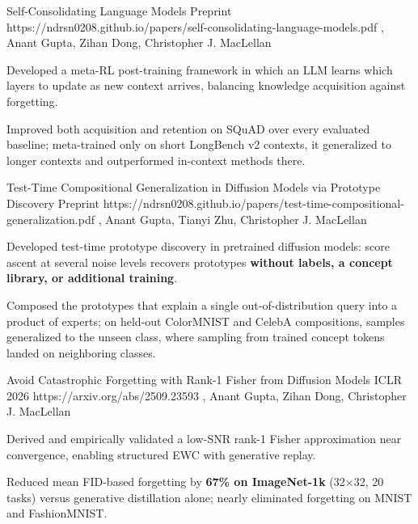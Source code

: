 \begin{samepage}
\CVPaperHeading
  {Self-Consolidating Language Models}
  {Preprint}
  {https://ndrsn0208.github.io/papers/self-consolidating-language-models.pdf}
  {\CVNameInAuthors\CVEqual, Anant Gupta\CVEqual, Zihan Dong, Christopher J. MacLellan}
\begin{CVHighlights}
  \item Developed a meta-RL post-training framework in which an LLM learns which
    layers to update as new context arrives, balancing knowledge acquisition
    against forgetting.
  \item Improved both acquisition and retention on SQuAD over every evaluated
    baseline; meta-trained only on short LongBench v2 contexts, it generalized to
    longer contexts and outperformed in-context methods there.
\end{CVHighlights}
\end{samepage}
\CVProjectGap

\begin{samepage}
\CVPaperHeading
  {Test-Time Compositional Generalization in Diffusion Models via Prototype Discovery}
  {Preprint}
  {https://ndrsn0208.github.io/papers/test-time-compositional-generalization.pdf}
  {\CVNameInAuthors, Anant Gupta, Tianyi Zhu, Christopher J. MacLellan}
\begin{CVHighlights}
  \item Developed test-time prototype discovery in pretrained diffusion models: score
    ascent at several noise levels recovers prototypes \textbf{without labels, a
    concept library, or additional training}.
  \item Composed the prototypes that explain a single out-of-distribution query into
    a product of experts; on held-out ColorMNIST and CelebA compositions, samples
    generalized to the unseen class, where sampling from trained concept tokens
    landed on neighboring classes.
\end{CVHighlights}
\end{samepage}
\CVProjectGap

\begin{samepage}
\CVPaperHeading
  {Avoid Catastrophic Forgetting with Rank-1 Fisher from Diffusion Models}
  {ICLR 2026}
  {https://arxiv.org/abs/2509.23593}
  {\CVNameInAuthors\CVEqual, Anant Gupta\CVEqual, Zihan Dong, Christopher J. MacLellan}
\begin{CVHighlights}
  \item Derived and empirically validated a low-SNR rank-1 Fisher approximation
    near convergence, enabling structured EWC with generative replay.
  \item Reduced mean FID-based forgetting by \textbf{67\% on ImageNet-1k}
    (32$\times$32, 20 tasks) versus generative distillation alone; nearly
    eliminated forgetting on MNIST and FashionMNIST.
\end{CVHighlights}
\end{samepage}
\CVProjectGap

